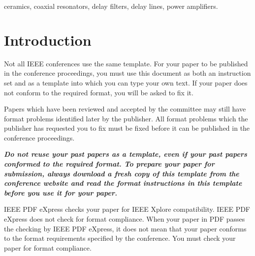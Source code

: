 \documentclass[conference,10pt,letterpaper]{IEEEtran}%
\begin{document}
\maketitle
%
%
%
\begin{abstract}
Limit your abstract to one paragraph and keep it short. In the
Keywords section, include a few keywords from:
http://www.ieee.org/organizations/pubs/ani\_prod/keywrd98.txt
\end{abstract}
%
\begin{IEEEkeywords}
ceramics, coaxial resonators, delay filters, delay lines, power amplifiers.
\end{IEEEkeywords}
%
%

\section{Introduction}

Not all IEEE conferences use the same template. For your paper to be
published in the conference proceedings, you must use this document as
both an instruction set and as a template into which you can type your
own text. If your paper does not conform to the required format, you
will be asked to fix it.

Papers which have been reviewed and accepted by the committee may
still have format problems identified later by the publisher. All
format problems which the publisher has requested you to fix must be
fixed before it can be published in the conference proceedings.

{\bfseries\itshape
Do not reuse your past papers as a template, even if your past papers
conformed to the required format. To prepare your paper for
submission, always download a fresh copy of this template from the
conference website and read the format instructions in this template
before you use it for your paper.
}

IEEE PDF eXpress checks your paper for IEEE Xplore compatibility. IEEE
PDF eXpress does not check for format compliance. When your paper in
PDF passes the checking by IEEE PDF eXpress, it does not mean that
your paper conforms to the format requirements specified by the
conference. You must check your paper for format compliance.
\end{document}
